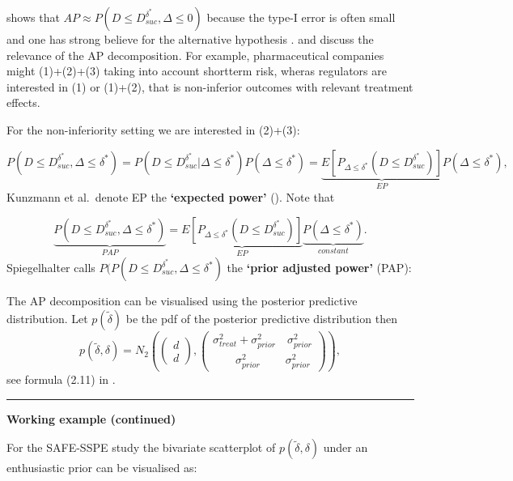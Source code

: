 \documentclass[
]{book}
\begin{document}
\citet{Spiegelhalter2003} shows that \(AP \approx P(D\leq D_{suc}^{\delta^*}, \Delta\leq0)\) because the type-I error is often small and one has strong believe for the alternative hypothesis \citet{Spiegelhalter2003}. \citet{Kunzmann2022} and \citet{OHagan2005} discuss the relevance of the AP decomposition. For example, pharmaceutical companies might (1)+(2)+(3) taking into account shortterm risk, wheras regulators are interested in (1) or (1)+(2), that is non-inferior outcomes with relevant treatment effects.

For the non-inferiority setting we are interested in (2)+(3):

\[
P(D\leq D_{suc}^{\delta^*}, \Delta\leq\delta^*)=P(D\leq D_{suc}^{\delta^*}|\Delta\leq\delta^*)P(\Delta\leq\delta^*)=\underbrace{E\left[P_{\Delta\leq\delta^*}(D\leq D_{suc}^{\delta^*})\right]}_{EP}P(\Delta\leq\delta^*),
\]
Kunzmann et al.~denote EP the \textbf{`expected power'} (\citet{Kunzmann2022}). Note that

\[
\underbrace{P(D\leq D_{suc}^{\delta^*}, \Delta\leq\delta^*)}_{PAP}=\underbrace{E\left[P_{\Delta\leq\delta^*}(D\leq D_{suc}^{\delta^*})\right]}_{EP}\underbrace{P(\Delta\leq\delta^*)}_{constant}.
\]
Spiegelhalter calls \(P(P(D\leq D_{suc}^{\delta^*}, \Delta\leq\delta^*)\) the \textbf{`prior adjusted power'} (PAP):

The AP decomposition can be visualised using the posterior predictive distribution. Let \(p(\tilde\delta)\) be the pdf of the posterior predictive distribution then
\[
p(\tilde\delta, \delta)= N_2\left(\begin{pmatrix} d \\ d \end{pmatrix}, \begin{pmatrix} \sigma^2_{treat}+\sigma^2_{prior} \quad \sigma^2_{prior} \\ \quad \quad \sigma^2_{prior} \quad \ \quad  \sigma^2_{prior}\end{pmatrix}\right),
\]
see formula (2.11) in \citet{Grieve2022}.

\begin{center}\rule{0.5\linewidth}{0.5pt}\end{center}

\textbf{Working example (continued) }

For the SAFE-SSPE study the bivariate scatterplot of \(p(\tilde\delta, \delta)\) under an enthusiastic prior can be visualised as:
\end{document}
